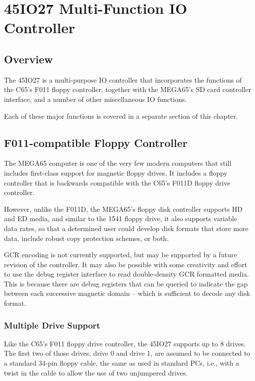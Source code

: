 \chapter{45IO27 Multi-Function IO Controller}

\section{Overview}

The 45IO27 is a multi-purpose IO controller that incorporates the functions of the
C65's F011 floppy controller, together with the MEGA65's SD card controller interface,
and a number of other miscellaneous IO functions.

Each of these major functions is covered in a separate section of this chapter.

\section{F011-compatible Floppy Controller}

The MEGA65 computer is one of the very few modern computers that still
includes first-class support for magnetic floppy drives.  It includes
a floppy controller that is backwards compatible with the C65's F011D
floppy drive controller.

However, unlike the F011D, the MEGA65's
floppy disk controller supports HD and ED media, and similar to the
1541 floppy drive, it also supports variable data rates, so that a
determined user could develop disk formats that store more data,
include robust copy protection schemes, or both.

GCR encoding is not currently supported, but may be supported by a
future revision of the controller.  It may also be possible with some
creativity and effort to use the debug register interface to read
double-density GCR formatted media.  This is because there are debug
registers that can be queried to indicate the gap between each
successive magnetic domain -- which is sufficient to decode any disk
format. 

\subsection{Multiple Drive Support}

Like the C65's F011 floppy drive controller, the 45IO27 supports up to 8 drives.
The first two of those drives, drive 0 and drive 1, are assumed to be connected to a
standard 34-pin floppy cable, the same as used in standard PCs, i.e.,
with a twist in the cable to allow the use of two unjumpered drives.

